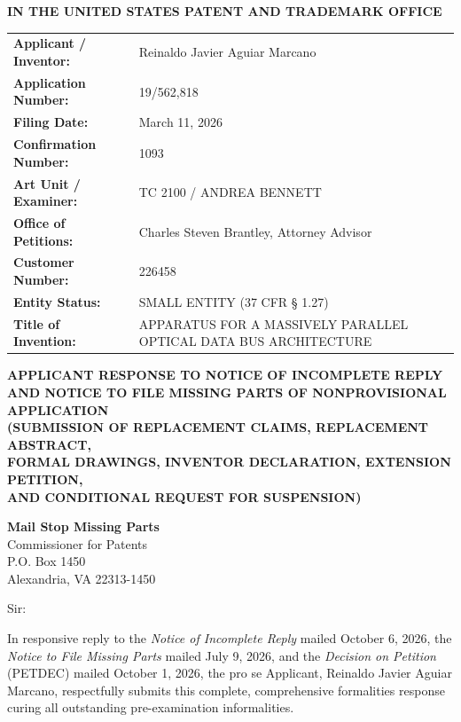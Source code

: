 \documentclass[11pt,letterpaper]{article}
\begin{document}
\thispagestyle{empty}

\begin{center}
    \textbf{\large IN THE UNITED STATES PATENT AND TRADEMARK OFFICE}
\end{center}

\vspace{0.3cm}
\noindent\begin{tabular}{p{2.3in}p{4.0in}}
\textbf{Applicant / Inventor:} & Reinaldo Javier Aguiar Marcano \\
\textbf{Application Number:} & 19/562,818 \\
\textbf{Filing Date:} & March 11, 2026 \\
\textbf{Confirmation Number:} & 1093 \\
\textbf{Art Unit / Examiner:} & TC 2100 / ANDREA BENNETT \\
\textbf{Office of Petitions:} & Charles Steven Brantley, Attorney Advisor \\
\textbf{Customer Number:} & 226458 \\
\textbf{Entity Status:} & SMALL ENTITY (37 CFR \S{} 1.27) \\
\textbf{Title of Invention:} & APPARATUS FOR A MASSIVELY PARALLEL OPTICAL DATA BUS ARCHITECTURE \\
\end{tabular}

\vspace{0.4cm}
\begin{center}
    \textbf{\large APPLICANT RESPONSE TO NOTICE OF INCOMPLETE REPLY \\
    AND NOTICE TO FILE MISSING PARTS OF NONPROVISIONAL APPLICATION} \\
    \textbf{\normalsize (SUBMISSION OF REPLACEMENT CLAIMS, REPLACEMENT ABSTRACT, \\
    FORMAL DRAWINGS, INVENTOR DECLARATION, EXTENSION PETITION, \\
    AND CONDITIONAL REQUEST FOR SUSPENSION)}
\end{center}

\noindent\textbf{Mail Stop Missing Parts} \\
Commissioner for Patents \\
P.O. Box 1450 \\
Alexandria, VA 22313-1450

\vspace{0.2cm}
Sir:

In responsive reply to the \textit{Notice of Incomplete Reply} mailed October 6, 2026, the \textit{Notice to File Missing Parts} mailed July 9, 2026, and the \textit{Decision on Petition} (PETDEC) mailed October 1, 2026, the pro se Applicant, Reinaldo Javier Aguiar Marcano, respectfully submits this complete, comprehensive formalities response curing all outstanding pre-examination informalities.
\end{document}
